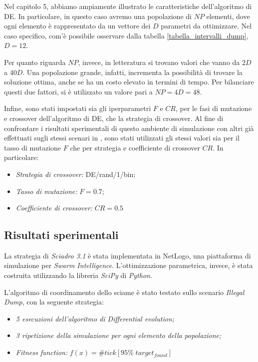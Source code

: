 Nel capitolo 5, abbiamo ampiamente illustrato le caratteristiche dell'algoritmo di DE.
In particolare, in questo caso avremo una popolazione di $NP$ elementi, dove ogni elemento è rappresentato da un vettore dei $D$ parametri da ottimizzare.
Nel caso specifico, com'è possibile osservare dalla tabella \ref{tabella_intervalli_dump}, $D=12$.

Per quanto riguarda $NP$, invece, in letteratura si trovano valori che vanno da $2D$ a $40D$.
Una popolazione grande, infatti, incrementa la possibilità di trovare la soluzione ottima, anche se ha un costo elevato in termini di tempo.
Per bilanciare questi due fattori, si è utilizzato un valore pari a $NP = 4D = 48$.

Infine, sono stati impostati sia gli iperparametri $F$ e $CR$, per le fasi di mutazione e crossover dell'algoritmo di DE, che la strategia di crossover.
Al fine di confrontare i risultati sperimentali di questo ambiente di simulazione con altri già effettuati sugli stessi scenari in \cite{cimino2019adaptive}, sono stati utilizzati gli stessi valori sia per il tasso di mutazione $F$ che per strategia e coefficiente di crossover $CR$.
In particolare:
\begin{itemize}
    \item \textit{Strategia di crossover:} DE/rand/1/bin;
    \item \textit{Tasso di mutazione:} $F=0.7$;
    \item \textit{Coefficiente di crossover:} $CR=0.5$
\end{itemize}

\subsection{Risultati sperimentali}

La strategia di \textit{Sciadro 3.1} è stata implementata in NetLogo, una piattaforma di simulazione per \textit{Swarm Intelligence}.
L'ottimizzazione parametrica, invece, è stata costruita utilizzando la libreria \textit{SciPy} di \textit{Python}.

L'algoritmo di coordinamento dello sciame è stato testato sullo scenario \textit{Illegal Dump}, con la seguente strategia:
\begin{itemize}
    \item \textit{5 esecuzioni dell'algoritmo di Differential evolution;}
    \item \textit{3 ripetizione della simulazione per ogni elemento della popolazione;}
    \item \textit{Fitness function:} $f(x) = \# tick[95 \% \; target_{found}]$
\end{itemize}


